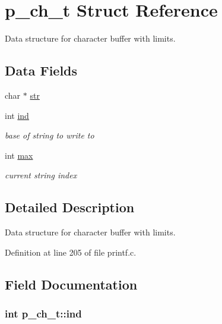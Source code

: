\hypertarget{structp__ch__t}{}\section{p\+\_\+ch\+\_\+t Struct Reference}
\label{structp__ch__t}


Data structure for character buffer with limits.  


\subsection*{Data Fields}
\begin{DoxyCompactItemize}
\item 
char $\ast$ \hyperlink{structp__ch__t_aa3c8616342a2717bc714bf1b6d00516f}{str}
\item 
int \hyperlink{structp__ch__t_a9d6834d749cd9232a16cb20b598fe90d}{ind}
\begin{DoxyCompactList}\small\item\em base of string to write to \end{DoxyCompactList}\item 
int \hyperlink{structp__ch__t_a0dee9f28e498d427e53051b7e1846d34}{max}
\begin{DoxyCompactList}\small\item\em current string index \end{DoxyCompactList}\end{DoxyCompactItemize}


\subsection{Detailed Description}
Data structure for character buffer with limits. 

Definition at line 205 of file printf.\+c.



\subsection{Field Documentation}
\subsubsection[{\texorpdfstring{ind}{ind}}]{\setlength{\rightskip}{0pt plus 5cm}int p\+\_\+ch\+\_\+t\+::ind}\hypertarget{structp__ch__t_a9d6834d749cd9232a16cb20b598fe90d}{}\label{structp__ch__t_a9d6834d749cd9232a16cb20b598fe90d}


